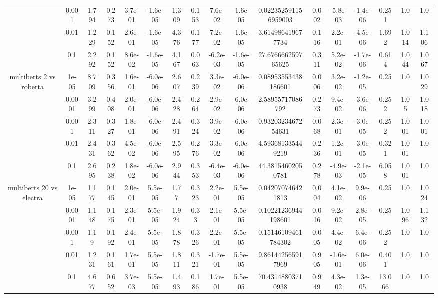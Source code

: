 \begin{tabular}{|c|c|c|c|c|c|c|c|c|c|c|c|c|c|c|c|c|}
 & 0.001 & 1.794 & 0.273 & 3.7e-01 & -1.6e-05 & 1.309 & 0.153 & 7.6e-02 & -1.6e-05 & 0.022352591156959003 & 0.002 & -5.8e-03 & -1.4e-06 & 0.251 & 1.0 & 1.0 \\
 & 0.01 & 1.229 & 0.152 & 2.6e-01 & -1.6e-05 & 4.376 & 0.177 & 7.2e-02 & -1.6e-05 & 3.614986419677734 & 0.116 & 2.2e-01 & -4.5e-06 & 1.692 & 1.014 & 1.106 \\
 & 0.1 & 2.292 & 0.152 & 8.6e-02 & -1.6e-05 & 4.167 & 0.063 & -6.2e-03 & -1.6e-05 & 27.676666259765625 & 0.311 & 5.2e-02 & -1.7e-06 & 0.614 & 1.044 & 1.067 \\
\hline
\multirow{5}{*}{multiberts 2 vs roberta } & 1e-05 & 8.709 & 0.356 & 1.6e-01 & -6.0e-06 & 2.607 & 0.239 & 3.3e-02 & -6.0e-06 & 0.08953553438186601 & 0.006 & 3.2e-02 & -1.2e-05 & 0.25 & 1.0 & 1.029 \\
 & 0.0001 & 3.299 & 0.408 & 2.0e-01 & -6.0e-06 & 2.428 & 0.264 & 2.9e-02 & -6.0e-06 & 2.58955717086792 & 0.273 & 9.4e-02 & -3.6e-06 & 0.252 & 1.05 & 1.018 \\
 & 0.001 & 2.311 & 0.327 & 1.8e-01 & -6.0e-06 & 2.491 & 0.324 & 3.9e-02 & -6.0e-06 & 0.9320323467254631 & 0.068 & 2.3e-01 & -3.0e-05 & 0.252 & 1.001 & 1.001 \\
 & 0.01 & 2.431 & 0.362 & 4.5e-02 & -6.0e-06 & 2.595 & 0.276 & 3.3e-02 & -6.0e-06 & 4.593681335449219 & 0.236 & 1.2e-01 & -3.0e-05 & 0.321 & 1.001 & 1.0 \\
 & 0.1 & 2.695 & 0.238 & 1.8e-02 & -6.0e-06 & 2.944 & 0.353 & -6.4e-03 & -6.0e-06 & 44.38154602050781 & 0.278 & -4.9e-03 & -2.1e-05 & 6.058 & 1.001 & 1.0 \\
\hline
\multirow{5}{*}{multiberts 20 vs electra } & 1e-05 & 1.177 & 0.145 & 2.0e-01 & 5.5e-05 & 1.77 & 0.323 & 2.2e-01 & 5.5e-05 & 0.042070746421813 & 0.004 & 4.1e-02 & 9.9e-06 & 0.25 & 1.0 & 1.024 \\
 & 0.0001 & 1.148 & 0.175 & 2.3e-01 & 5.5e-05 & 1.924 & 0.33 & 2.1e-01 & 5.5e-05 & 0.10221236944198601 & 0.016 & 9.2e-02 & 2.8e-05 & 0.25 & 1.096 & 1.132 \\
 & 0.001 & 1.19 & 0.192 & 2.4e-01 & 5.5e-05 & 1.878 & 0.326 & 2.2e-01 & 5.5e-05 & 0.15146109461784302 & 0.005 & 4.4e-02 & 6.4e-06 & 0.252 & 1.0 & 1.0 \\
 & 0.01 & 1.231 & 0.161 & 1.7e-01 & 5.5e-05 & 1.811 & 0.321 & -1.7e-01 & 5.5e-05 & 9.861442565917969 & 0.905 & -1.6e-01 & 6.0e-06 & 0.401 & 1.0 & 1.0 \\
 & 0.1 & 4.677 & 0.652 & 3.7e-03 & 5.5e-05 & 1.493 & 0.186 & 1.7e-01 & 5.5e-05 & 70.43148803710938 & 0.949 & 4.3e-02 & 1.3e-05 & 13.066 & 1.0 & 1.0 \\

\end{tabular}
